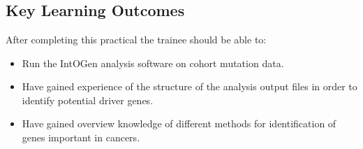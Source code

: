 



\chapter{\moduleTitle}


\newpage


\section{Key Learning Outcomes}

After completing this practical the trainee should be able to:

\begin{itemize}
  \item Run the IntOGen analysis software on cohort mutation data.
  \item Have gained experience of the structure of the analysis output files in order to identify potential driver genes.
  \item Have gained overview knowledge of different methods for identification of genes important in cancers.
\end{itemize}


